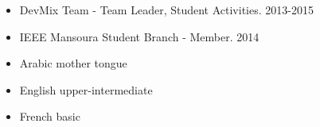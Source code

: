 \documentclass[10pt,a4paper]{altacv}
\begin{document}



\smallskip
\begin{itemize}

\item DevMix Team - Team Leader, Student Activities.
\hspace{0.7 cm} 2013-2015

\smallskip
\item IEEE Mansoura Student Branch - Member. \hspace{0.3 cm} 2014

\end{itemize}


\smallskip
\begin{itemize}

\item Arabic \hspace{0.5 cm} mother tongue

\smallskip
\item English \hspace{0.5 cm} upper-intermediate

\smallskip
\item French \hspace{0.5 cm} basic

\end{itemize}




\clearpage




\end{document}

